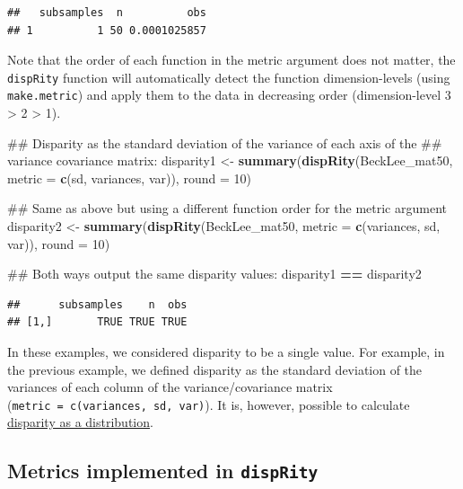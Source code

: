 \documentclass[]{book}
\newenvironment{Shaded}{\begin{snugshade}}{\end{snugshade}}
\newcommand{\KeywordTok}[1]{\textcolor[rgb]{0.13,0.29,0.53}{\textbf{#1}}}
\newcommand{\DataTypeTok}[1]{\textcolor[rgb]{0.13,0.29,0.53}{#1}}
\newcommand{\DecValTok}[1]{\textcolor[rgb]{0.00,0.00,0.81}{#1}}
\newcommand{\StringTok}[1]{\textcolor[rgb]{0.31,0.60,0.02}{#1}}
\newcommand{\OperatorTok}[1]{\textcolor[rgb]{0.81,0.36,0.00}{\textbf{#1}}}
\newcommand{\NormalTok}[1]{#1}
\theoremstyle{definition}
\theoremstyle{definition}
\theoremstyle{remark}
\begin{document}
\begin{verbatim}
##   subsamples  n          obs
## 1          1 50 0.0001025857
\end{verbatim}

Note that the order of each function in the metric argument does not
matter, the \texttt{dispRity} function will automatically detect the
function dimension-levels (using \texttt{make.metric}) and apply them to
the data in decreasing order (dimension-level 3 \textgreater{} 2
\textgreater{} 1).

\begin{Shaded}
\begin{Highlighting}[]
\NormalTok{## Disparity as the standard deviation of the variance of each axis of the}
\NormalTok{## variance covariance matrix:}
\NormalTok{disparity1 <-}\StringTok{ }\KeywordTok{summary}\NormalTok{(}\KeywordTok{dispRity}\NormalTok{(BeckLee_mat50, }\DataTypeTok{metric =} \KeywordTok{c}\NormalTok{(sd, variances, var)),}
                      \DataTypeTok{round =} \DecValTok{10}\NormalTok{)}

\NormalTok{## Same as above but using a different function order for the metric argument}
\NormalTok{disparity2 <-}\StringTok{ }\KeywordTok{summary}\NormalTok{(}\KeywordTok{dispRity}\NormalTok{(BeckLee_mat50, }\DataTypeTok{metric =} \KeywordTok{c}\NormalTok{(variances, sd, var)),}
                      \DataTypeTok{round =} \DecValTok{10}\NormalTok{)}

\NormalTok{## Both ways output the same disparity values:}
\NormalTok{disparity1 }\OperatorTok{==}\StringTok{ }\NormalTok{disparity2}
\end{Highlighting}
\end{Shaded}

\begin{verbatim}
##      subsamples    n  obs
## [1,]       TRUE TRUE TRUE
\end{verbatim}

In these examples, we considered disparity to be a single value. For
example, in the previous example, we defined disparity as the standard
deviation of the variances of each column of the variance/covariance
matrix (\texttt{metric\ =\ c(variances,\ sd,\ var)}). It is, however,
possible to calculate
\protect\hyperlink{disparity-as-a-distribution}{disparity as a
distribution}.

\subsection{\texorpdfstring{Metrics implemented in
\texttt{dispRity}}{Metrics implemented in dispRity}}\label{metrics-implemented-in-disprity}
\end{document}
